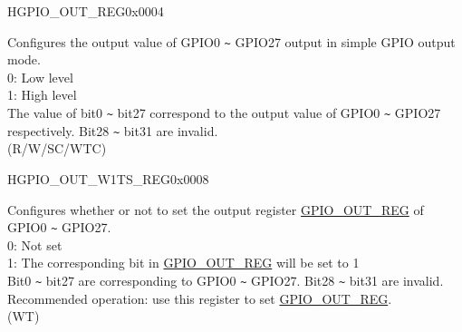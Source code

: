 

\begin{register}{H}{GPIO\_OUT\_REG}{0x0004}\label{regdesc:GPIOOUTREG}
%
\regnewline%
\begin{regdesc}\begin{reglist}
\label{fielddesc:GPIOOUTDATAORIG}\item [GPIO\_OUT\_DATA\_ORIG] Configures the output value of GPIO0 \verb+~+ GPIO27 output in simple GPIO output mode.\\
0: Low level\\
1: High level\\
The value of bit0 \verb+~+ bit27 correspond to the output value of GPIO0 \verb+~+ GPIO27 respectively. Bit28 \verb+~+ bit31 are invalid.\\
(R/W/SC/WTC)
\end{reglist}\end{regdesc}
\end{register}


\begin{register}{H}{GPIO\_OUT\_W1TS\_REG}{0x0008}\label{regdesc:GPIOOUTW1TSREG}
%
\regnewline%
\begin{regdesc}\begin{reglist}
\label{fielddesc:GPIOOUTW1TS}\item [GPIO\_OUT\_W1TS] Configures whether or not to set the output register \hyperref[regdesc:GPIOOUTREG]{GPIO\_OUT\_REG} of GPIO0 \verb+~+ GPIO27.\\
0: Not set\\
1: The corresponding bit in \hyperref[regdesc:GPIOOUTREG]{GPIO\_OUT\_REG} will be set to 1\\
Bit0 \verb+~+ bit27 are corresponding to GPIO0 \verb+~+ GPIO27. Bit28 \verb+~+ bit31 are invalid.
Recommended operation: use this register to set \hyperref[regdesc:GPIOOUTREG]{GPIO\_OUT\_REG}. \\
(WT)
\end{reglist}\end{regdesc}
\end{register}


